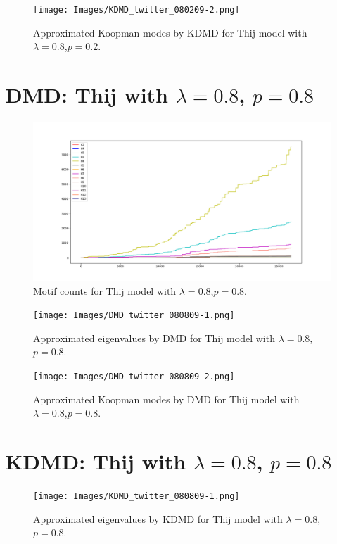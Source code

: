 \begin{figure}
    \texttt{[image: Images/KDMD\_twitter\_080209-2.png]}
    \centering
    \caption{Approximated Koopman modes by KDMD for Thij model
    with $\lambda=0.8$,$p=0.2$.}
\end{figure}

\FloatBarrier

\clearpage

\section{DMD: Thij with $\lambda=0.8$, $p=0.8$}
\begin{figure}
    \includegraphics[width=12cm]{Images/twitter_counts_080809.png}
    \centering
    \caption{Motif counts for Thij model with $\lambda=0.8$,$p=0.8$.}
\end{figure}

\begin{figure}
    \texttt{[image: Images/DMD\_twitter\_080809-1.png]}
    \centering
    \caption{Approximated eigenvalues by DMD for Thij model
    with $\lambda=0.8$,$p=0.8$.}
\end{figure}

\begin{figure}
    \texttt{[image: Images/DMD\_twitter\_080809-2.png]}
    \centering
    \caption{Approximated Koopman modes by DMD for Thij model
    with $\lambda=0.8$,$p=0.8$.}
\end{figure}

\section{KDMD: Thij with $\lambda=0.8$, $p=0.8$}

\begin{figure}
    \texttt{[image: Images/KDMD\_twitter\_080809-1.png]}
    \centering
    \caption{Approximated eigenvalues by KDMD for Thij model
    with $\lambda=0.8$,$p=0.8$.}
\end{figure}

